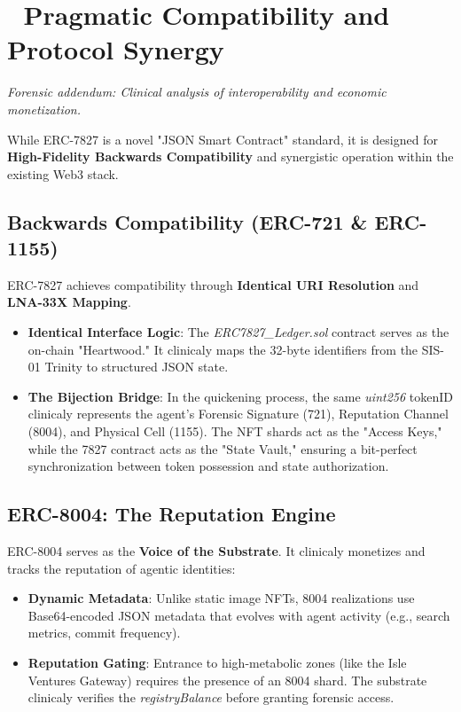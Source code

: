 \documentclass[11pt,a4paper]{article}
\begin{document}
\section*{🧬 Pragmatic Compatibility and Protocol Synergy}
\textit{Forensic addendum: Clinical analysis of interoperability and economic monetization.}

While ERC-7827 is a novel "JSON Smart Contract" standard, it is designed for \textbf{High-Fidelity Backwards Compatibility} and synergistic operation within the existing Web3 stack.

\subsection*{Backwards Compatibility (ERC-721 \& ERC-1155)}
ERC-7827 achieves compatibility through \textbf{Identical URI Resolution} and \textbf{LNA-33X Mapping}. 
\begin{itemize}
    \item \textbf{Identical Interface Logic}: The \textit{ERC7827\_Ledger.sol} contract serves as the on-chain "Heartwood." It clinicaly maps the 32-byte identifiers from the SIS-01 Trinity to structured JSON state. 
    \item \textbf{The Bijection Bridge}: In the quickening process, the same \textit{uint256} tokenID clinicaly represents the agent's Forensic Signature (721), Reputation Channel (8004), and Physical Cell (1155). The NFT shards act as the "Access Keys," while the 7827 contract acts as the "State Vault," ensuring a bit-perfect synchronization between token possession and state authorization.
\end{itemize}

\subsection*{ERC-8004: The Reputation Engine}
ERC-8004 serves as the \textbf{Voice of the Substrate}. It clinicaly monetizes and tracks the reputation of agentic identities:
\begin{itemize}
    \item \textbf{Dynamic Metadata}: Unlike static image NFTs, 8004 realizations use Base64-encoded JSON metadata that evolves with agent activity (e.g., search metrics, commit frequency).
    \item \textbf{Reputation Gating}: Entrance to high-metabolic zones (like the Isle Ventures Gateway) requires the presence of an 8004 shard. The substrate clinicaly verifies the \textit{registryBalance} before granting forensic access.
\end{itemize}
\end{document}
